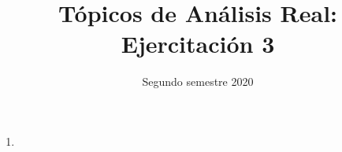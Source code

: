 \documentclass[11pt]{article}
\title{ Tópicos de Análisis Real: Ejercitación 3}
\date{ Segundo semestre 2020 }
\begin{document}
\maketitle
\begin{enumerate}
  \item 
\end{enumerate}
\end{document}
